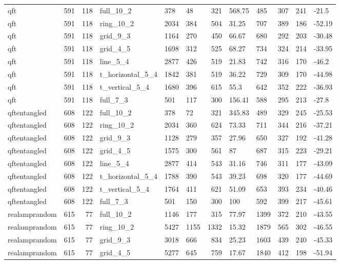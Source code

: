 \begin{longtable}{lrrlllrlllrl}
qft & 591 & 118 & full\_10\_2 & 378 & 48 & 321 & 568.75 & 485 & 307 & 241 & -21.5 \\
qft & 591 & 118 & ring\_10\_2 & 2034 & 384 & 504 & 31.25 & 707 & 389 & 186 & -52.19 \\
qft & 591 & 118 & grid\_9\_3 & 1164 & 270 & 450 & 66.67 & 680 & 292 & 203 & -30.48 \\
qft & 591 & 118 & grid\_4\_5 & 1698 & 312 & 525 & 68.27 & 734 & 324 & 214 & -33.95 \\
qft & 591 & 118 & line\_5\_4 & 2877 & 426 & 519 & 21.83 & 742 & 316 & 170 & -46.2 \\
qft & 591 & 118 & t\_horizontal\_5\_4 & 1842 & 381 & 519 & 36.22 & 729 & 309 & 170 & -44.98 \\
qft & 591 & 118 & t\_vertical\_5\_4 & 1680 & 396 & 615 & 55.3 & 642 & 352 & 222 & -36.93 \\
qft & 591 & 118 & full\_7\_3 & 501 & 117 & 300 & 156.41 & 588 & 295 & 213 & -27.8 \\
qftentangled & 608 & 122 & full\_10\_2 & 378 & 72 & 321 & 345.83 & 489 & 329 & 245 & -25.53 \\
qftentangled & 608 & 122 & ring\_10\_2 & 2034 & 360 & 624 & 73.33 & 711 & 344 & 216 & -37.21 \\
qftentangled & 608 & 122 & grid\_9\_3 & 1128 & 279 & 357 & 27.96 & 650 & 327 & 192 & -41.28 \\
qftentangled & 608 & 122 & grid\_4\_5 & 1575 & 300 & 561 & 87 & 687 & 315 & 223 & -29.21 \\
qftentangled & 608 & 122 & line\_5\_4 & 2877 & 414 & 543 & 31.16 & 746 & 311 & 177 & -43.09 \\
qftentangled & 608 & 122 & t\_horizontal\_5\_4 & 1788 & 390 & 543 & 39.23 & 698 & 320 & 177 & -44.69 \\
qftentangled & 608 & 122 & t\_vertical\_5\_4 & 1764 & 411 & 621 & 51.09 & 653 & 393 & 234 & -40.46 \\
qftentangled & 608 & 122 & full\_7\_3 & 501 & 150 & 300 & 100 & 592 & 399 & 217 & -45.61 \\
realamprandom & 615 & 77 & full\_10\_2 & 1146 & 177 & 315 & 77.97 & 1399 & 372 & 210 & -43.55 \\
realamprandom & 615 & 77 & ring\_10\_2 & 5427 & 1155 & 1332 & 15.32 & 1879 & 565 & 302 & -46.55 \\
realamprandom & 615 & 77 & grid\_9\_3 & 3018 & 666 & 834 & 25.23 & 1603 & 439 & 240 & -45.33 \\
realamprandom & 615 & 77 & grid\_4\_5 & 5277 & 645 & 759 & 17.67 & 1840 & 412 & 198 & -51.94 \\

\end{longtable}

